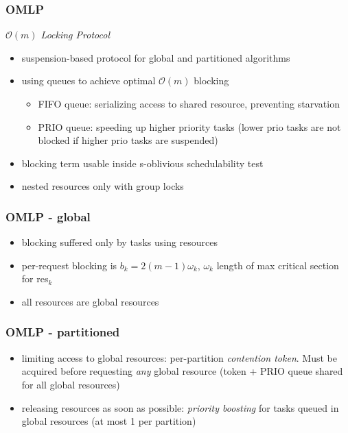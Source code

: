 \documentclass{beamer}
\begin{document}
\begin{frame}
\frametitle{OMLP}
\emph{$\mathcal{O}(m)$ Locking Protocol}
\begin{itemize}
\item suspension-based protocol for global and partitioned algorithms
\item using queues to achieve optimal $\mathcal{O}(m)$ blocking
  \begin{itemize}
  \item FIFO queue: serializing access to shared resource, preventing starvation
  \item PRIO queue: speeding up higher priority tasks (lower prio tasks are not blocked if higher prio tasks are suspended)
  \end{itemize}
\item blocking term usable inside s-oblivious schedulability test
\item nested resources only with group locks
\end{itemize}
\end{frame}

\begin{frame}
\frametitle{OMLP - global}
\centerline{}
\begin{itemize}
\item blocking suffered only by tasks using resources
\item per-request blocking is $b_k=2(m-1)\omega_k$, $\omega_k$ length of max critical section for res$_k$
\item all resources are global resources
\end{itemize}
\end{frame}

\begin{frame}
\frametitle{OMLP - partitioned}
\centerline{}
\begin{itemize}
\item limiting access to global resources: per-partition \emph{contention token}. Must be acquired before requesting \emph{any} global resource (token + PRIO queue shared for all global resources)
\item releasing resources as soon as possible: \emph{priority boosting} for tasks queued in global resources (at most 1 per partition)
\end{itemize}
\end{frame}
\end{document}
